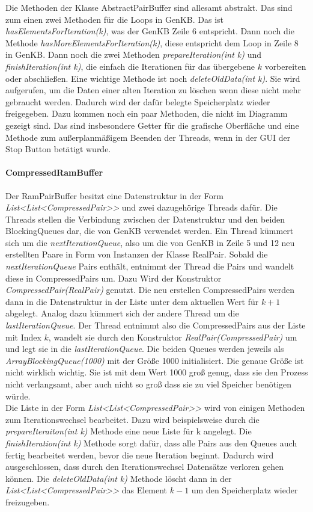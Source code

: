 \documentclass[12pt,a4paper]{article}
\begin{document}
Die Methoden der Klasse AbstractPairBuffer sind allesamt abstrakt. Das sind zum einen zwei Methoden für die Loops in GenKB. Das ist \textit{hasElementsForIteration(k)}, was der GenKB Zeile 6 entspricht. Dann noch die Methode \textit{hasMoreElementsForIteration(k)}, diese entspricht dem Loop in Zeile 8 in GenKB. Dann noch die zwei Methoden \textit{prepareIteration(int k)} und \textit{finishIteration(int k)}, die einfach die Iterationen für das übergebene $k$ vorbereiten oder abschließen. Eine wichtige Methode ist noch \textit{deleteOldData(int k)}. Sie wird aufgerufen, um die Daten einer alten Iteration zu löschen wenn diese nicht mehr gebraucht werden. Dadurch wird der dafür belegte Speicherplatz wieder freigegeben. Dazu kommen noch ein paar Methoden, die nicht im Diagramm gezeigt sind. Das sind insbesondere Getter für die grafische Oberfläche und eine Methode zum außerplanmäßigem Beenden der Threads, wenn in der GUI der Stop Button betätigt wurde.



\paragraph{CompressedRamBuffer}\mbox{}
\label{sec:compressedrambuffer}


Der RamPairBuffer besitzt eine Datenstruktur in der Form \textit{List<List<CompressedPair>>} und zwei dazugehörige Threads dafür. Die Threads stellen die Verbindung zwischen der Datenstruktur und den beiden BlockingQueues dar, die von GenKB verwendet werden. Ein Thread kümmert sich um die \textit{nextIterationQueue}, also um die von GenKB in Zeile 5 und 12  neu erstellten Paare in Form von Instanzen der Klasse RealPair. Sobald die \textit{nextIterationQueue} Pairs enthält, entnimmt der Thread die Pairs und wandelt diese in CompressedPairs um. Dazu Wird der Konstruktor \textit{CompressedPair(RealPair)} genutzt. Die neu erstellen CompressedPairs werden dann in die Datenstruktur in der Liste unter dem aktuellen Wert für $k+1$ abgelegt. Analog dazu kümmert sich der andere Thread um die \textit{lastIterationQueue}. Der Thread entnimmt also die CompressedPairs aus der Liste mit Index $k$, wandelt sie durch den Konstruktor \textit{RealPair(CompressedPair)} um und legt sie in die \textit{lastIterationQueue}. Die beiden Queues werden jeweils als \textit{ArrayBlockingQueue(1000)} mit der Größe 1000 initialisiert. Die genaue Größe ist nicht wirklich wichtig. Sie ist mit dem Wert 1000 groß genug, dass sie den Prozess nicht verlangsamt, aber auch nicht so groß dass sie zu viel Speicher benötigen würde. \\
Die Liste in der Form \textit{List<List<CompressedPair>>} wird von einigen Methoden zum Iterationswechsel bearbeitet. Dazu wird beispielsweise durch die \textit{prepareIteraiton(int k)} Methode eine neue Liste für k angelegt. Die \textit{finishIteration(int k)} Methode sorgt dafür, dass alle Pairs aus den Queues auch fertig bearbeitet werden, bevor die neue Iteration beginnt. Dadurch wird ausgeschlossen, dass durch den Iterationswechsel Datensätze verloren gehen können. Die \textit{deleteOldData(int k)} Methode löscht dann in der \textit{List<List<CompressedPair>>} das Element $k-1$ um den Speicherplatz wieder freizugeben.
\end{document}
